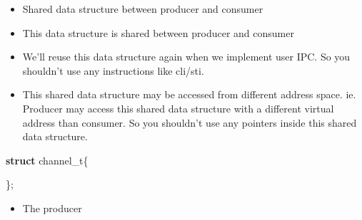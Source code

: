 \documentclass[]{article}
\newenvironment{Shaded}{}{}
\newcommand{\KeywordTok}[1]{\textbf{{#1}}}
\newcommand{\NormalTok}[1]{{#1}}
\providecommand{\tightlist}{%
  \setlength{\itemsep}{0pt}\setlength{\parskip}{0pt}}
\begin{document}
\begin{itemize}
\tightlist
\item
  Shared data structure between producer and consumer
\item
  This data structure is shared between producer and consumer
\item
  We'll reuse this data structure again when we implement user IPC. So
  you shouldn't use any instructions like cli/sti.
\item
  This shared data structure may be accessed from different address
  space. ie. Producer may access this shared data structure with a
  different virtual address than consumer. So you shouldn't use any
  pointers inside this shared data structure.
\end{itemize}

\begin{Shaded}
\begin{Highlighting}[]
\KeywordTok{struct} \NormalTok{channel_t\{}

\NormalTok{\};}
\end{Highlighting}
\end{Shaded}

\begin{itemize}
\tightlist
\item
  The producer
\end{itemize}
\end{document}
